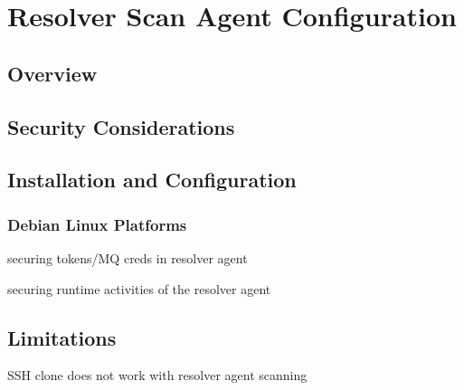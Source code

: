 \section{Resolver Scan Agent Configuration}\label{sec:resolver-agent}

\subsection{Overview}





\subsection{Security Considerations}


\subsection{Installation and Configuration}

\subsubsection{Debian Linux Platforms}

securing tokens/MQ creds in resolver agent

securing runtime activities of the resolver agent


\subsection{Limitations}
SSH clone does not work with resolver agent scanning
